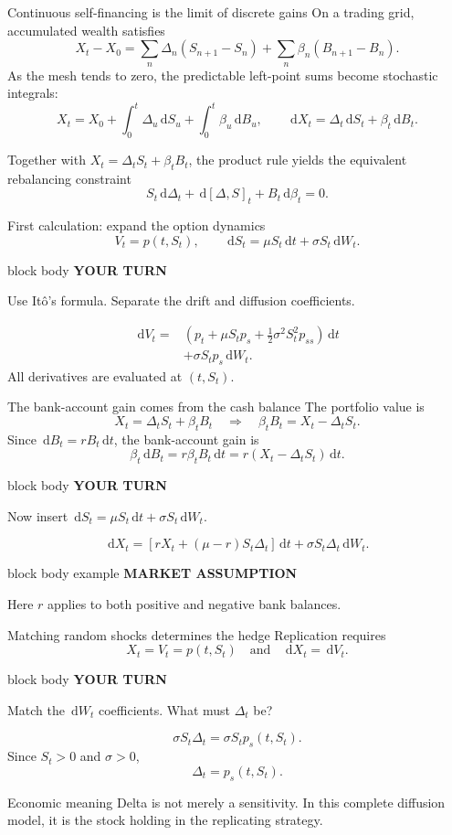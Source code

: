 \documentclass[handout,10pt,aspectratio=169]{beamer}
\newenvironment{marketbox}{%
  \begin{beamercolorbox}[rounded=true,sep=0.7em,wd=\textwidth]{block body example}
  \textbf{\color{CourseGreen}MARKET ASSUMPTION}\quad
}{\end{beamercolorbox}}
\newenvironment{pausebox}{%
  \begin{beamercolorbox}[rounded=true,sep=0.8em,wd=\textwidth]{block body}
  \textbf{\color{CourseGold}YOUR TURN}\quad
}{\end{beamercolorbox}}
\newcommand{\dd}{\,\mathrm d}
\newcommand{\1}{\mathbf 1}
\begin{document}
\begin{frame}{Continuous self-financing is the limit of discrete gains}
\small
On a trading grid, accumulated wealth satisfies
\[
X_t-X_0
=\sum_n\Delta_n(S_{n+1}-S_n)
+\sum_n\beta_n(B_{n+1}-B_n).
\]
As the mesh tends to zero, the predictable left-point sums become stochastic
integrals:
\[
\boxed{
X_t=X_0+\int_0^t\Delta_u\dd S_u+\int_0^t\beta_u\dd B_u,}
\qquad
\boxed{\dd X_t=\Delta_t\dd S_t+\beta_t\dd B_t.}
\]

Together with \(X_t=\Delta_tS_t+\beta_tB_t\), the product rule yields the
equivalent rebalancing constraint
\[
\boxed{
S_t\dd\Delta_t+\dd[\Delta,S]_t+B_t\dd\beta_t=0.}
\]
\end{frame}

\begin{frame}{First calculation: expand the option dynamics}
\[
V_t=p(t,S_t),
\qquad
\dd S_t=\mu S_t\dd t+\sigma S_t\dd W_t.
\]
\begin{pausebox}
Use It\^o's formula. Separate the drift and diffusion coefficients.
\end{pausebox}

\[
\boxed{
\begin{aligned}
\dd V_t
={}&\left(
p_t+\mu S_tp_s+\frac12\sigma^2S_t^2p_{ss}
\right)\dd t\\
&+\sigma S_tp_s\dd W_t.
\end{aligned}}
\]
All derivatives are evaluated at \((t,S_t)\).
\end{frame}

\begin{frame}{The bank-account gain comes from the cash balance}
\small
The portfolio value is
\[
X_t=\Delta_tS_t+\beta_tB_t
\quad\Longrightarrow\quad
\boxed{\beta_tB_t=X_t-\Delta_tS_t.}
\]
Since \(\dd B_t=rB_t\dd t\), the bank-account gain is
\[
\boxed{\beta_t\dd B_t
=r\beta_tB_t\dd t
=r(X_t-\Delta_tS_t)\dd t.}
\]
\begin{pausebox}
Now insert \(\dd S_t=\mu S_t\dd t+\sigma S_t\dd W_t\).
\end{pausebox}

\[
\boxed{
\dd X_t
=\left[rX_t+(\mu-r)S_t\Delta_t\right]\dd t
+\sigma S_t\Delta_t\dd W_t.}
\]
\begin{marketbox}
Here \(r\) applies to both positive and negative bank balances.
\end{marketbox}
\end{frame}

\begin{frame}{Matching random shocks determines the hedge}
Replication requires
\[
X_t=V_t=p(t,S_t)
\quad\text{and}\quad
\dd X_t=\dd V_t.
\]
\begin{pausebox}
Match the \(\dd W_t\) coefficients. What must \(\Delta_t\) be?
\end{pausebox}

\[
\sigma S_t\Delta_t=\sigma S_tp_s(t,S_t).
\]
Since \(S_t>0\) and \(\sigma>0\),
\[
\boxed{\Delta_t=p_s(t,S_t).}
\]
\begin{block}{Economic meaning}
Delta is not merely a sensitivity. In this complete diffusion model, it is
the stock holding in the replicating strategy.
\end{block}
\end{frame}
\end{document}
